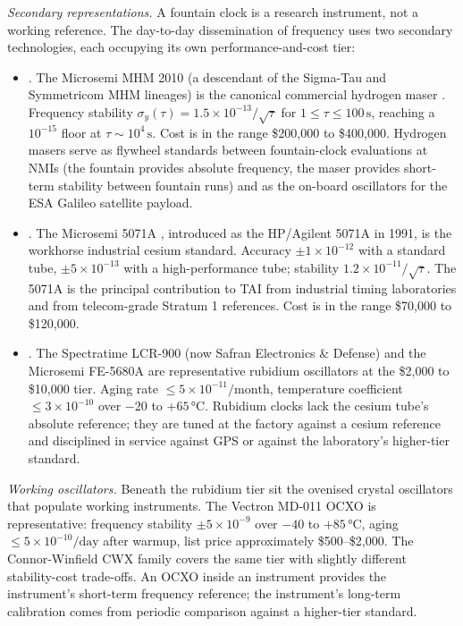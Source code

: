 \textit{Secondary representations.} A fountain clock is a research
instrument, not a working reference. The day-to-day dissemination of
frequency uses two secondary technologies, each occupying its own
performance-and-cost tier:

\begin{itemize}[leftmargin=*]
  \item {}. The Microsemi MHM 2010 (a
    descendant of the Sigma-Tau and Symmetricom MHM lineages) is the
    canonical commercial hydrogen maser
    \cite{web:ch03t3-microsemi-mhm-2010}. Frequency stability
    $\sigma_{y}(\tau) = 1.5 \times 10^{-13}/\sqrt{\tau}$ for $1
    \leq \tau \leq 100 \,\si{\second}$, reaching a $10^{-15}$ floor
    at $\tau \sim 10^{4} \,\si{\second}$. Cost is in the range
    \$200{,}000 to \$400{,}000. Hydrogen masers serve as flywheel
    standards between fountain-clock evaluations at NMIs (the
    fountain provides absolute frequency, the maser provides
    short-term stability between fountain runs) and as the on-board
    oscillators for the ESA Galileo satellite payload.
  \item {}. The Microsemi 5071A
    \cite{web:ch03t3-microsemi-5071a}, introduced as the HP/Agilent
    5071A in 1991, is the workhorse industrial cesium standard.
    Accuracy $\pm 1 \times 10^{-12}$ with a standard tube,
    $\pm 5 \times 10^{-13}$ with a high-performance tube; stability
    $1.2 \times 10^{-11}/\sqrt{\tau}$. The 5071A is the principal
    contribution to TAI from industrial timing laboratories and
    from telecom-grade Stratum 1 references. Cost is in the range
    \$70{,}000 to \$120{,}000.
  \item {}. The Spectratime
    LCR-900 (now Safran Electronics \& Defense)
    \cite{web:ch03t3-spectratime-lcr-900} and the Microsemi FE-5680A
    are representative rubidium oscillators at the \$2{,}000 to
    \$10{,}000 tier. Aging rate $\leq 5 \times 10^{-11}/\text{
    month}$, temperature coefficient $\leq 3 \times 10^{-10}$ over
    $-20$ to $+65 \,\si{\degreeCelsius}$. Rubidium clocks lack the
    cesium tube's absolute reference; they are tuned at the factory
    against a cesium reference and disciplined in service against
    GPS or against the laboratory's higher-tier standard.
\end{itemize}

\textit{Working oscillators.} Beneath the rubidium tier sit the
ovenised crystal oscillators that populate working instruments. The
Vectron MD-011 OCXO \cite{web:ch03t3-vectron-md-011} is
representative: frequency stability $\pm 5 \times 10^{-9}$ over
$-40$ to $+85 \,\si{\degreeCelsius}$, aging
$\leq 5 \times 10^{-10}/\text{day}$ after warmup, list price
approximately \$500--\$2{,}000. The Connor-Winfield CWX family
covers the same tier with slightly different stability-cost
trade-offs. An OCXO inside an instrument provides the instrument's
short-term frequency reference; the instrument's long-term
calibration comes from periodic comparison against a higher-tier
standard.

